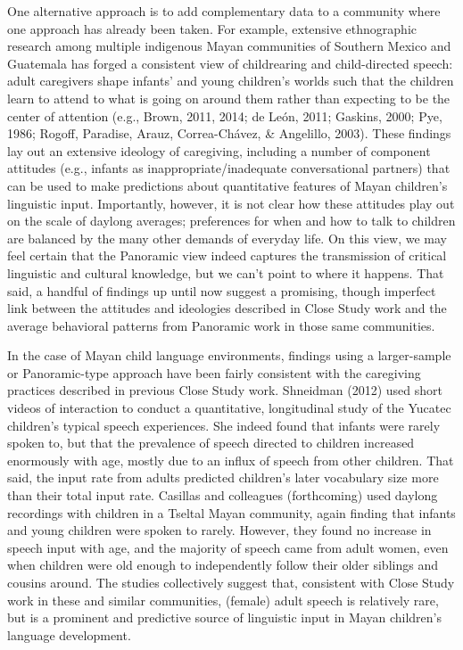 \documentclass[,man,floatsintext]{apa6}
\begin{document}
One alternative approach is to add complementary data to a community
where one approach has already been taken. For example, extensive
ethnographic research among multiple indigenous Mayan communities of
Southern Mexico and Guatemala has forged a consistent view of
childrearing and child-directed speech: adult caregivers shape infants'
and young children's worlds such that the children learn to attend to
what is going on around them rather than expecting to be the center of
attention (e.g., Brown, 2011, 2014; de León, 2011; Gaskins, 2000; Pye,
1986; Rogoff, Paradise, Arauz, Correa-Chávez, \& Angelillo, 2003). These
findings lay out an extensive ideology of caregiving, including a number
of component attitudes (e.g., infants as inappropriate/inadequate
conversational partners) that can be used to make predictions about
quantitative features of Mayan children's linguistic input. Importantly,
however, it is not clear how these attitudes play out on the scale of
daylong averages; preferences for when and how to talk to children are
balanced by the many other demands of everyday life. On this view, we
may feel certain that the Panoramic view indeed captures the
transmission of critical linguistic and cultural knowledge, but we can't
point to where it happens. That said, a handful of findings up until now
suggest a promising, though imperfect link between the attitudes and
ideologies described in Close Study work and the average behavioral
patterns from Panoramic work in those same communities.

In the case of Mayan child language environments, findings using a
larger-sample or Panoramic-type approach have been fairly consistent
with the caregiving practices described in previous Close Study work.
Shneidman (2012) used short videos of interaction to conduct a
quantitative, longitudinal study of the Yucatec children's typical
speech experiences. She indeed found that infants were rarely spoken to,
but that the prevalence of speech directed to children increased
enormously with age, mostly due to an influx of speech from other
children. That said, the input rate from adults predicted children's
later vocabulary size more than their total input rate. Casillas and
colleagues (forthcoming) used daylong recordings with children in a
Tseltal Mayan community, again finding that infants and young children
were spoken to rarely. However, they found no increase in speech input
with age, and the majority of speech came from adult women, even when
children were old enough to independently follow their older siblings
and cousins around. The studies collectively suggest that, consistent
with Close Study work in these and similar communities, (female) adult
speech is relatively rare, but is a prominent and predictive source of
linguistic input in Mayan children's language development.
\end{document}
